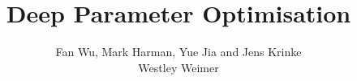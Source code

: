 \documentclass{sig-alternate}
\begin{document}
\title{Deep Parameter Optimisation}

%
\author{
%
%
\alignauthor Fan Wu, Mark Harman, Yue Jia and Jens Krinke\\
\alignauthor Westley Weimer\\
       \\
}

\maketitle
\begin{abstract}

%
%

\end{abstract}
\end{document}
